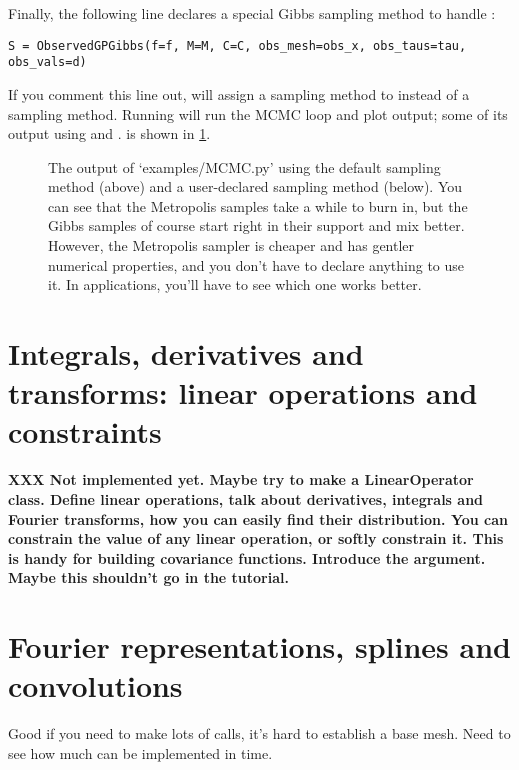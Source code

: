 \documentclass{manual}
\begin{document}
Finally, the following line declares a special Gibbs sampling method to handle :
\begin{verbatim}
S = ObservedGPGibbs(f=f, M=M, C=C, obs_mesh=obs_x, obs_taus=tau, obs_vals=d)
\end{verbatim}
If you comment this line out,  will assign a  sampling method to  instead of a  sampling method. Running  will run the MCMC loop and plot output; some of its output using  and . is shown in \ref{fig:MCMCOutput}. 

\begin{figure}
	\centering
	\caption{The output of {\sffamily `examples/MCMC.py'} using the default  sampling method (above) and a user-declared  sampling method (below). You can see that the Metropolis samples take a while to burn in, but the Gibbs samples of course start right in their support and mix better. However, the Metropolis sampler is cheaper and has gentler numerical properties, and you don't have to declare anything to use it. In applications, you'll have to see which one works better.}
	\label{fig:MCMCOutput}
\end{figure} 

\section{Integrals, derivatives and transforms: linear operations and constraints}\label{sec:linop} %

\textbf{XXX Not implemented yet. Maybe try to make a LinearOperator class. Define linear operations, talk about derivatives, integrals and Fourier transforms, how you can easily find their distribution. You can constrain the value of any linear operation, or softly constrain it. This is handy for building covariance functions. Introduce the  argument. Maybe this shouldn't go in the tutorial.}


\section{Fourier representations, splines and convolutions}\label{sec:approx} %
Good if you need to make lots of calls, it's hard to establish a base mesh. Need to see how much can be implemented in time.
\end{document}
